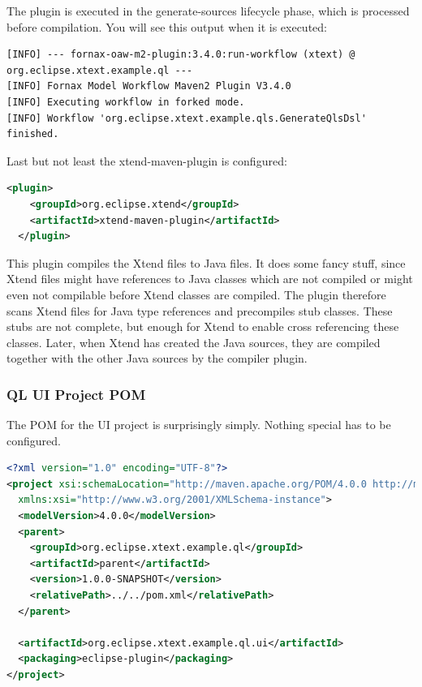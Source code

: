 The plugin is executed in the generate-sources lifecycle phase, which is
processed before compilation. You will see this output when it is executed:

\begin{lstlisting}
[INFO] --- fornax-oaw-m2-plugin:3.4.0:run-workflow (xtext) @ org.eclipse.xtext.example.ql ---
[INFO] Fornax Model Workflow Maven2 Plugin V3.4.0
[INFO] Executing workflow in forked mode.
[INFO] Workflow 'org.eclipse.xtext.example.qls.GenerateQlsDsl' finished.
\end{lstlisting}

Last but not least the xtend-maven-plugin is configured:
\begin{lstlisting}[language=XML]
  <plugin>
    <groupId>org.eclipse.xtend</groupId>
    <artifactId>xtend-maven-plugin</artifactId>
  </plugin>
\end{lstlisting}

This plugin compiles the Xtend files to Java files. It does some fancy stuff,
since Xtend files might have references to Java classes which are not compiled
or might even not compilable before Xtend classes are compiled. The plugin
therefore scans Xtend files for Java type references and precompiles stub
classes. These stubs are not complete, but enough for Xtend to enable cross
referencing these classes. Later, when Xtend has created the Java sources, they
are compiled together with the other Java sources by the compiler plugin.

\subsubsection{QL UI Project POM}
The POM for the UI project is surprisingly simply. Nothing special has to be
configured.

\begin{lstlisting}[language=XML]
<?xml version="1.0" encoding="UTF-8"?>
<project xsi:schemaLocation="http://maven.apache.org/POM/4.0.0 http://maven.apache.org/xsd/maven-4.0.0.xsd" xmlns="http://maven.apache.org/POM/4.0.0"
  xmlns:xsi="http://www.w3.org/2001/XMLSchema-instance">
  <modelVersion>4.0.0</modelVersion>
  <parent>
    <groupId>org.eclipse.xtext.example.ql</groupId>
    <artifactId>parent</artifactId>
    <version>1.0.0-SNAPSHOT</version>
    <relativePath>../../pom.xml</relativePath>
  </parent>

  <artifactId>org.eclipse.xtext.example.ql.ui</artifactId>
  <packaging>eclipse-plugin</packaging>
</project>
\end{lstlisting}

